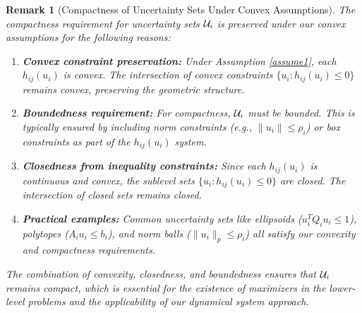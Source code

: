 \documentclass[journal,twoside,web]{ieeecolor}
\newtheorem{remark}{Remark}
\begin{document}
{\color{blue} \begin{remark}[Compactness of Uncertainty Sets Under Convex Assumptions]
The compactness requirement for uncertainty sets ${\cal U}_i$ is preserved under our convex assumptions for the following reasons:

\begin{enumerate}
\item \textbf{Convex constraint preservation:} Under Assumption \ref{assume1}, each $h_{ij}(u_i)$ is convex. The intersection of convex constraints $\{u_i : h_{ij}(u_i) \leq 0\}$ remains convex, preserving the geometric structure.

\item \textbf{Boundedness requirement:} For compactness, ${\cal U}_i$ must be bounded. This is typically ensured by including norm constraints (e.g., $\|u_i\| \leq \rho_i$) or box constraints as part of the $h_{ij}(u_i)$ system.

\item \textbf{Closedness from inequality constraints:} Since each $h_{ij}(u_i)$ is continuous and convex, the sublevel sets $\{u_i : h_{ij}(u_i) \leq 0\}$ are closed. The intersection of closed sets remains closed.

\item \textbf{Practical examples:} Common uncertainty sets like ellipsoids ($u_i^T Q_i u_i \leq 1$), polytopes ($A_i u_i \leq b_i$), and norm balls ($\|u_i\|_p \leq \rho_i$) all satisfy our convexity and compactness requirements.
\end{enumerate}

The combination of convexity, closedness, and boundedness ensures that ${\cal U}_i$ remains compact, which is essential for the existence of maximizers in the lower-level problems and the applicability of our dynamical system approach.
\end{remark}}
\end{document}
